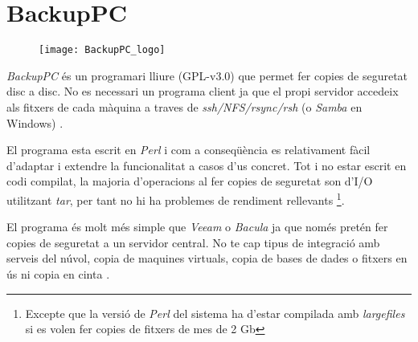 
\section{BackupPC}%
\label{sec:backuppc}

\begin{figure}[H]
    \centering
    \texttt{[image: BackupPC\_logo]}
\end{figure}

\emph{BackupPC} és un programari lliure (GPL-v3.0) que permet fer copies de seguretat
disc a disc. No es necessari un programa client ja que el propi servidor
accedeix als fitxers de cada màquina a traves de \emph{ssh/NFS/rsync/rsh} (o
\emph{Samba} en Windows) \cite{noauthor_about_nodate}.

El programa esta escrit en \emph{Perl} i com a conseqüència es relativament fàcil
d'adaptar i extendre la funcionalitat a casos d'us concret. Tot i no estar
escrit en codi compilat, la majoria d'operacions al fer copies de seguretat son d'I/O
utilitzant \emph{tar}, per tant no hi ha problemes de rendiment rellevants
\footnote{Excepte que la versió de \emph{Perl} del sistema ha d'estar compilada
amb \emph{largefiles} si es volen fer copies de fitxers de mes de 2 Gb
}.

El programa és molt més simple que \emph{Veeam} o \emph{Bacula} ja que només
pretén fer copies de seguretat a un servidor central. No te cap tipus de
integració amb serveis del núvol, copia de maquines virtuals, copia de bases de
dades o fitxers en ús ni copia en cinta \cite{noauthor_backuppc_nodate}.
